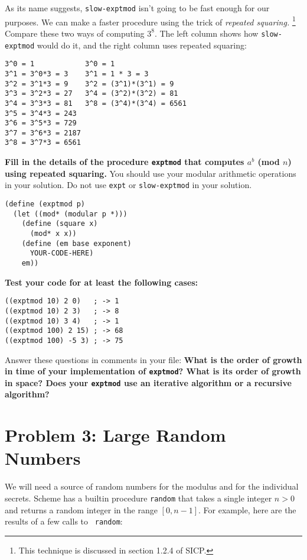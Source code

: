 As its name suggests, {\tt slow-exptmod} isn't going to be fast enough
for our purposes.  We can make a faster procedure using the trick of
{\it repeated squaring.}%
\footnote{This technique is discussed in section 1.2.4 of SICP.}
Compare these two ways of computing $3^8$.  The left column shows how
{\tt slow-exptmod} would do it, and the right column uses repeated
squaring:

\begin{verbatim}
3^0 = 1            3^0 = 1
3^1 = 3^0*3 = 3    3^1 = 1 * 3 = 3
3^2 = 3^1*3 = 9    3^2 = (3^1)*(3^1) = 9
3^3 = 3^2*3 = 27   3^4 = (3^2)*(3^2) = 81
3^4 = 3^3*3 = 81   3^8 = (3^4)*(3^4) = 6561
3^5 = 3^4*3 = 243
3^6 = 3^5*3 = 729
3^7 = 3^6*3 = 2187
3^8 = 3^7*3 = 6561
\end{verbatim}

\newpage

{\bf Fill in the details of the procedure {\tt exptmod}
     that computes $a^b $ (mod $n$) using repeated squaring.} 
     You should use your modular arithmetic operations in your
     solution. Do not use {\tt expt} or {\tt slow-exptmod} in
     your solution.

\begin{verbatim}
(define (exptmod p)
  (let ((mod* (modular p *)))
    (define (square x)
      (mod* x x))
    (define (em base exponent)
      YOUR-CODE-HERE)
    em))
\end{verbatim}

{\bf Test your code for at least the following cases:}
\begin{verbatim}
((exptmod 10) 2 0)   ; -> 1
((exptmod 10) 2 3)   ; -> 8
((exptmod 10) 3 4)   ; -> 1
((exptmod 100) 2 15) ; -> 68
((exptmod 100) -5 3) ; -> 75
\end{verbatim}

Answer these questions in comments in your file: {\bf What is the
  order of growth in time of your implementation of {\tt exptmod}?
  What is its order of growth in space?  Does your {\tt exptmod}
  use an iterative algorithm or a recursive algorithm?}


\section*{Problem 3: Large Random Numbers}

We will need a source of random numbers for the modulus and for the
individual secrets.  Scheme has a builtin procedure {\tt random} that
takes a single integer $n>0$ and returns a random integer in the range
$[0,n-1]$.  For example, here are the results of a few calls to {\tt
  random}:

